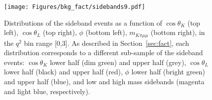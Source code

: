 


\begin{figure}[!hbt]
  \centering
  \texttt{[image: Figures/bkg\_fact/sidebands9.pdf]}
  \caption{Distributions of the sideband events as a function of $\cos\theta_K$ (top left), $\cos\theta_L$ (top right), $\phi$ (bottom left), $m_{K\pi\mu\mu}$ (bottom right), in the $q^2$ bin range [0,3]. As described in Section~\ref{sec:fact}, each distribution corresponds to a different sub-sample of the sideband events: $\cos\theta_K$ lower half (dim green) and upper half (grey), $\cos\theta_L$ lower half (black) and upper half (red), $\phi$ lower half (bright green) and upper half (blue), and low and high mass sidebands (magenta and light blue, respectively).}
  \label{fig:side9}
\end{figure}


